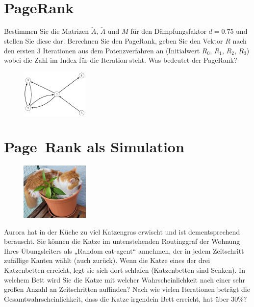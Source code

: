 \documentclass[a4paper,11pt]{report}
\begin{document}
    \newpage

    \chapter{PageRank}
    \label{ch:pageRank}
    Bestimmen Sie die Matrizen $\widetilde{A}$, $\widetilde{A}$ und $M$ für den Dämpfungsfaktor $d = 0.75$ und stellen Sie diese dar.
    Berechnen Sie den PageRank, geben Sie den Vektor $R$ nach den ersten $3$ Iterationen aus dem Potenzverfahren an (Initialwert $R_0$, $R_1$, $R_2$, $R_3$) wobei die Zahl im Index für die Iteration steht.
    Was bedeutet der PageRank?

    \begin{figure}[H]
        \includegraphics[width=0.3\textwidth]{a06a_graph}
        \label{fig:a06_graph}
    \end{figure}

    \newpage

    \chapter[Page Rank als Simulation]{Page~Rank als Simulation}
    \label{ch:pageRankSim}

    \begin{figure}
        \centering
        \includegraphics[width=0.3\textwidth]{a07a_cat}
        \label{fig:a06_cat}
    \end{figure}

    Aurora hat in der Küche zu viel Katzengras erwischt und ist dementsprechend berauscht.
    Sie können die Katze im untenstehenden Routinggraf der Wohnung Ihres Übungsleiters als „Random cat-agent“ annehmen,
    der in jedem Zeitschritt zufällige Kanten wählt (auch zurück).
    Wenn die Katze eines der drei Katzenbetten erreicht, legt sie sich dort schlafen (Katzenbetten sind Senken).
    In welchem Bett wird Sie die Katze mit welcher Wahrscheinlichkeit nach einer sehr großen Anzahl an Zeitschritten auffinden?
    Nach wie vielen Iterationen beträgt die Gesamtwahrscheinlichkeit, dass die Katze irgendein Bett erreicht, hat über 30\%?
\end{document}
